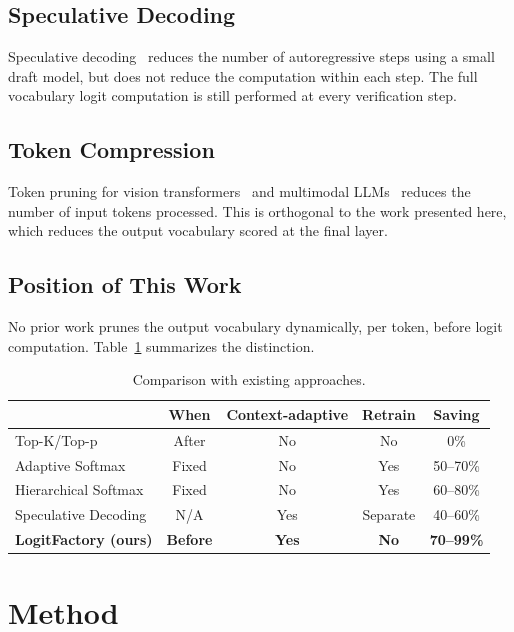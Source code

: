 \documentclass[11pt]{article}
\begin{document}
\subsection{Speculative Decoding}

Speculative decoding~\cite{leviathan2023fast} reduces the number of autoregressive steps using a small draft model, but does not reduce the computation within each step. The full vocabulary logit computation is still performed at every verification step.

\subsection{Token Compression}

Token pruning for vision transformers~\cite{rao2021dynamicvit} and multimodal LLMs~\cite{chen2024survey} reduces the number of input tokens processed. This is orthogonal to the work presented here, which reduces the output vocabulary scored at the final layer.

\subsection{Position of This Work}

No prior work prunes the output vocabulary dynamically, per token, before logit computation. Table~\ref{tab:comparison} summarizes the distinction.

\begin{table}[h]
\centering
\caption{Comparison with existing approaches.}
\label{tab:comparison}
\begin{tabular}{lcccc}
\toprule
 & When & Context-adaptive & Retrain & Saving \\
\midrule
Top-K/Top-p           & After  & No  & No  & 0\%      \\
Adaptive Softmax      & Fixed  & No  & Yes & 50--70\% \\
Hierarchical Softmax  & Fixed  & No  & Yes & 60--80\% \\
Speculative Decoding  & N/A    & Yes & Separate & 40--60\% \\
\textbf{LogitFactory (ours)} & \textbf{Before} & \textbf{Yes} & \textbf{No} & \textbf{70--99\%} \\
\bottomrule
\end{tabular}
\end{table}

\section{Method}
\end{document}
